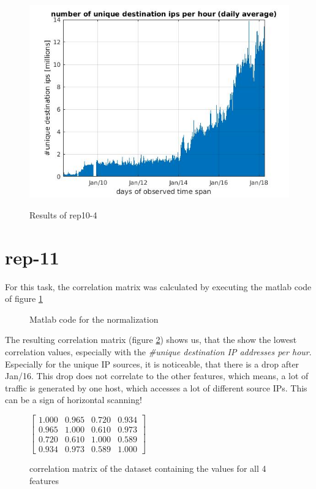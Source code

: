 \begin{figure}[H]
\center
\includegraphics[width=.7\textwidth]{./chapters/plots/rep10_4.jpg}\\
\caption{Results of rep10-4}
\end{figure}

\section*{rep-11}
For this task, the correlation matrix was calculated by executing the matlab code of figure \ref{fig:correlation}
\begin{figure}[H]

\caption{Matlab code for the normalization}
\label{fig:correlation}
\end{figure}
The resulting correlation matrix (figure \ref{matrix:correlation}) shows us, that the  show the lowest correlation values, especially with the \textit{\#unique destination IP addresses per hour}. Especially for the unique IP sources, it is noticeable, that there is a drop after Jan/16. This drop does not correlate to the other features, which means, a lot of traffic is generated by one host, which accesses a lot of different source IPs. This can be a sign of horizontal scanning!

\begin{figure}[H]
\center
$
\begin{bmatrix}
1.000 &  0.965 &  0.720 &  0.934 \\
0.965 &  1.000 &  0.610 &  0.973 \\
0.720 &  0.610 &  1.000 &  0.589 \\
0.934 &  0.973 &  0.589 &  1.000
\end{bmatrix}
$
\caption{correlation matrix of the dataset containing the values for all 4 features}
\label{matrix:correlation}
\end{figure}

